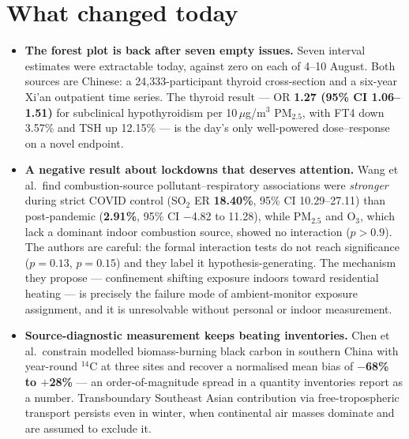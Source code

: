 \documentclass[10pt]{article}
\begin{document}
\section*{\sffamily\bfseries\color{Deep}What changed today}
\vspace{-1.5mm}{\color{Amber}\rule{\linewidth}{1.1pt}}\vspace{2.5mm}

\footnotesize
\begin{itemize}
\item \textbf{The forest plot is back after seven empty issues.} Seven interval estimates
were extractable today, against zero on each of 4--10 August. Both sources are
Chinese: a 24{,}333-participant thyroid cross-section and a six-year Xi'an outpatient
time series. The thyroid result --- OR \textbf{1.27 (95\% CI 1.06--1.51)} for subclinical
hypothyroidism per 10\,$\mu$g/m$^3$ PM$_{2.5}$, with FT4 down 3.57\% and TSH up 12.15\%
--- is the day's only well-powered dose--response on a novel endpoint.

\item \textbf{A negative result about lockdowns that deserves attention.} Wang et al.\
find combustion-source pollutant--respiratory associations were \emph{stronger} during
strict COVID control (SO$_2$ ER \textbf{18.40\%}, 95\% CI 10.29--27.11) than
post-pandemic (\textbf{2.91\%}, 95\% CI $-$4.82 to 11.28), while PM$_{2.5}$ and O$_3$,
which lack a dominant indoor combustion source, showed no interaction ($p>0.9$). The
authors are careful: the formal interaction tests do not reach significance
($p=0.13$, $p=0.15$) and they label it hypothesis-generating. The mechanism they
propose --- confinement shifting exposure indoors toward residential heating --- is
precisely the failure mode of ambient-monitor exposure assignment, and it is unresolvable
without personal or indoor measurement.

\item \textbf{Source-diagnostic measurement keeps beating inventories.} Chen et al.\
constrain modelled biomass-burning black carbon in southern China with year-round
$^{14}$C at three sites and recover a normalised mean bias of \textbf{$-$68\% to
$+$28\%} --- an order-of-magnitude spread in a quantity inventories report as a number.
Transboundary Southeast Asian contribution via free-tropospheric transport persists even
in winter, when continental air masses dominate and are assumed to exclude it.


\end{itemize}
\end{document}

